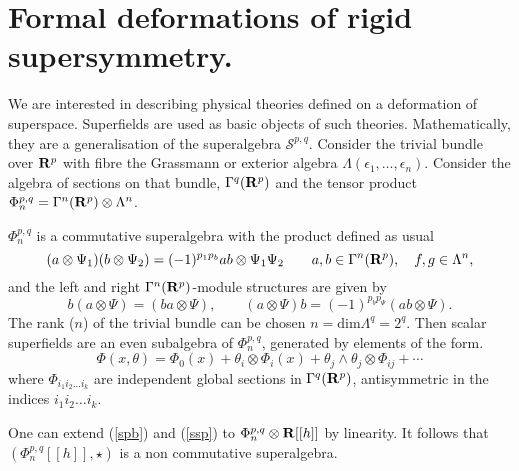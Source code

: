 \documentclass[a4paper,12pt]{article}
\begin{document}
 
                                                 



\section{Formal deformations of rigid supersymmetry.}

We are interested in describing physical theories  defined on  a
deformation 
of superspace. Superfields are used as basic objects of such theories.
Mathematically,
 they are a generalisation of the superalgebra $\mathcal{S}^{p,q}$.
Consider the
trivial bundle over ${\bf R}^p$ with fibre the Grassmann or exterior algebra
$\Lambda(\epsilon_1,\dots,\epsilon_n)$. Consider the algebra of sections
on that bundle, $\Gamma^q({\bf R}^p)$ and the tensor product
$\Phi^{p,q}_n=\Gamma^n({\bf R}^p)\otimes\Lambda^n $.

$\Phi^{p,q}_n$ is a commutative superalgebra with the product defined as
usual
$$
(a\otimes \Psi_1)(b\otimes \Psi_2)=(-1)^{p_1p_b}ab\otimes
\Psi_1\Psi_2\qquad a,b\in \Gamma^n({\bf R}^p),
\quad f,g\in \Lambda^n,
$$
and the left and right $\Gamma^n({\bf R}^p)$-module structures are given by
$$
b(a\otimes \Psi)=(ba\otimes \Psi),\qquad (a\otimes
\Psi)b=(-1)^{p_bp_\Psi}(ab\otimes \Psi).
$$
The rank  ($n$) of the trivial bundle can be  chosen  
$n=\mbox{dim}\Lambda^q=2^q$. Then scalar superfields are an  even
subalgebra of $\Phi^{p,q}_n$,
 generated by elements of the form. 
$$
\Phi(x,\theta)=\Phi_0(x) +\theta_i\otimes\Phi_i(x)
+\theta_j\wedge\theta_j\otimes\Phi_{ij}+\cdots
$$
where $\Phi_{i_1i_2\dots i_k}$ are independent global sections in
$\Gamma^q({\bf R}^p)$, antisymmetric
in the indices ${i_1i_2\dots i_k}$.


One can  extend (\ref{spb}) and (\ref{ssp}) to $\Phi^{p,q}_n\otimes
{\bf R}[[h]]$ by linearity. 
 It follows that  $(\Phi^{p,q}_n[[h]],\star)$ is a non commutative
superalgebra.

\bigskip
 
\end{document}
